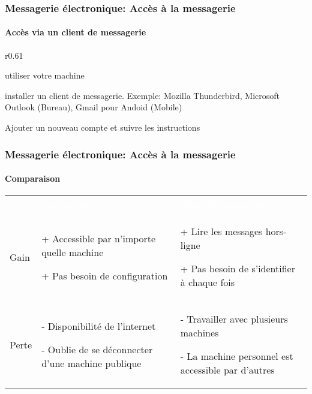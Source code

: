 \documentclass[xcolor=table]{beamer}
\begin{document}
\begin{frame}
\frametitle{Messagerie électronique: Accès à la messagerie}
\framesubtitle{Accès via un client de messagerie}

\begin{wrapfigure}{r}{0.61\textwidth}
	\vspace{-1cm}
\end{wrapfigure}

\mysphere utiliser votre machine

\mysphere installer un client de messagerie. Exemple: Mozilla Thunderbird, Microsoft Outlook (Bureau), Gmail pour Andoid (Mobile)

\mysphere Ajouter un nouveau compte et suivre les instructions 


\end{frame}

\begin{frame}
\frametitle{Messagerie électronique: Accès à la messagerie}
\framesubtitle{Comparaison}

\begin{tabular}{p{}p{}p{}}
	\rowcolor{darkblue}
	& \textcolor{white}{Navigateur web} & \textcolor{white}{Client de messagerie} \\
	
	Gain &
	+ Accessible par n'importe quelle machine
	
	+ Pas besoin de configuration
	
	& 
	+ Lire les messages hors-ligne
	
	+ Pas besoin de s'identifier à chaque fois
	\\
	
	Perte &
	- Disponibilité de l'internet
	
	- Oublie de se déconnecter d'une machine publique
	&
	- Travailler avec plusieurs machines
	
	- La machine personnel est accessible par d'autres
	\\
\end{tabular}

\end{frame}
\end{document}
